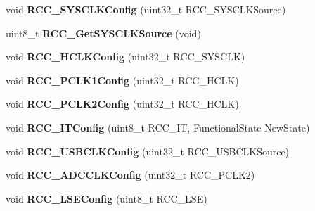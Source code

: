 \begin{DoxyCompactItemize}
\item 
\hypertarget{group__RCC__Exported__Functions_ga3551a36a8f0a3dc96a74d6b939048337}{
void {\bfseries RCC\_\-SYSCLKConfig} (uint32\_\-t RCC\_\-SYSCLKSource)}
\label{group__RCC__Exported__Functions_ga3551a36a8f0a3dc96a74d6b939048337}

\item 
\hypertarget{group__RCC__Exported__Functions_gaaeb32311c208b2a980841c9c884a41ea}{
uint8\_\-t {\bfseries RCC\_\-GetSYSCLKSource} (void)}
\label{group__RCC__Exported__Functions_gaaeb32311c208b2a980841c9c884a41ea}

\item 
\hypertarget{group__RCC__Exported__Functions_ga9d0aec72e236c6cdf3a3a82dfb525491}{
void {\bfseries RCC\_\-HCLKConfig} (uint32\_\-t RCC\_\-SYSCLK)}
\label{group__RCC__Exported__Functions_ga9d0aec72e236c6cdf3a3a82dfb525491}

\item 
\hypertarget{group__RCC__Exported__Functions_ga448137346d4292985d4e7a61dd1a824f}{
void {\bfseries RCC\_\-PCLK1Config} (uint32\_\-t RCC\_\-HCLK)}
\label{group__RCC__Exported__Functions_ga448137346d4292985d4e7a61dd1a824f}

\item 
\hypertarget{group__RCC__Exported__Functions_ga09f9c010a4adca9e036da42c2ca6126a}{
void {\bfseries RCC\_\-PCLK2Config} (uint32\_\-t RCC\_\-HCLK)}
\label{group__RCC__Exported__Functions_ga09f9c010a4adca9e036da42c2ca6126a}

\item 
\hypertarget{group__RCC__Exported__Functions_gaa953aa226e9ce45300d535941e4dfe2f}{
void {\bfseries RCC\_\-ITConfig} (uint8\_\-t RCC\_\-IT, FunctionalState NewState)}
\label{group__RCC__Exported__Functions_gaa953aa226e9ce45300d535941e4dfe2f}

\item 
\hypertarget{group__RCC__Exported__Functions_ga895b3ff3d143c990f1cd0146aa260081}{
void {\bfseries RCC\_\-USBCLKConfig} (uint32\_\-t RCC\_\-USBCLKSource)}
\label{group__RCC__Exported__Functions_ga895b3ff3d143c990f1cd0146aa260081}

\item 
\hypertarget{group__RCC__Exported__Functions_gadda89cdb838bf49e5fa10f3f774530a4}{
void {\bfseries RCC\_\-ADCCLKConfig} (uint32\_\-t RCC\_\-PCLK2)}
\label{group__RCC__Exported__Functions_gadda89cdb838bf49e5fa10f3f774530a4}

\item 
\hypertarget{group__RCC__Exported__Functions_ga65209ab5c3589b249c7d70f978735ca6}{
void {\bfseries RCC\_\-LSEConfig} (uint8\_\-t RCC\_\-LSE)}
\label{group__RCC__Exported__Functions_ga65209ab5c3589b249c7d70f978735ca6}


\end{DoxyCompactItemize}
